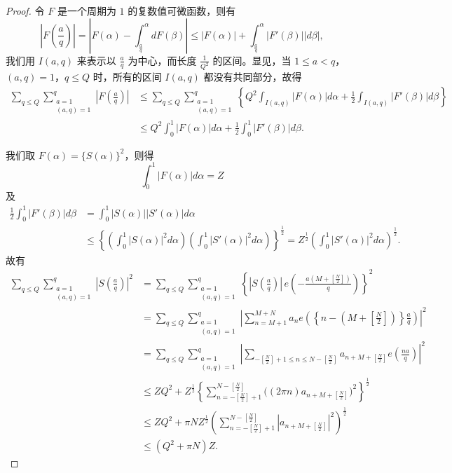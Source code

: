 \begin{proof}
令 $F$ 是一个周期为 $1$ 的复数值可微函数，则有
\[
\left|F\left(\frac{a}{q}\right)\right|
=\left|F(\alpha)-\int_{\frac{a}{q}}^{\alpha}dF(\beta)\right|
\leqslant|F(\alpha)|+\int_{\frac{a}{q}}^{\alpha}|F'(\beta)||d\beta|,
\]
我们用 $I(a,q)$ 来表示以 $\frac{a}{q}$ 为中心，而长度 $\frac{1}{Q^2}$ 的区间。显见，当 $1\leqslant a<q$，$(a,q)=1$，$q\leqslant Q$ 时，所有的区间 $I(a,q)$ 都没有共同部分，故得
\begin{align*}
\sum_{q\leqslant Q}\sum_{\substack{a=1\\(a,q)=1}}^{q}
\left|F\left(\frac{a}{q}\right)\right|
&\leqslant\sum_{q\leqslant Q}\sum_{\substack{a=1\\(a,q)=1}}^{q}
\left\{Q^2\int_{I(a,q)}|F(\alpha)|d\alpha
+\frac{1}{2}\int_{I(a,q)}|F'(\beta)|d\beta\right\}\\
&\leqslant Q^2\int_{0}^{1}|F(\alpha)|d\alpha
+\frac{1}{2}\int_{0}^{1}|F'(\beta)|d\beta.
\end{align*}

我们取 $F(\alpha)=\{S(\alpha)\}^2$，则得
\[
\int_{0}^{1}|F(\alpha)|d\alpha=Z
\]
及
\begin{align*}
\frac{1}{2}\int_{0}^{1}|F'(\beta)|d\beta
&=\int_{0}^{1}|S(\alpha)||S'(\alpha)|d\alpha\\
&\leqslant\left\{\left(\int_{0}^{1}|S(\alpha)|^2d\alpha\right)
\left(\int_{0}^{1}|S'(\alpha)|^2d\alpha\right)\right\}^{\frac12}
=Z^{\frac12}\left(\int_{0}^{1}|S'(\alpha)|^2d\alpha\right)^{\frac12}.
\end{align*}
故有
\begin{align*}
\sum_{q\leqslant Q}\sum_{\substack{a=1\\(a,q)=1}}^{q}
\left|S\left(\frac{a}{q}\right)\right|^2
&=\sum_{q\leqslant Q}\sum_{\substack{a=1\\(a,q)=1}}^{q}
\left\{\left|S\left(\frac{a}{q}\right)\right|
\,e\left(-\frac{a\left(M+\left[\frac{N}{2}\right]\right)}{q}\right)\right\}^2\\
&=\sum_{q\leqslant Q}\sum_{\substack{a=1\\(a,q)=1}}^{q}
\left|\sum_{n=M+1}^{M+N}a_n e\left(\left\{n-\left(M+\left[\frac{N}{2}\right]\right)\right\}\frac{a}{q}\right)\right|^2\\
&=\sum_{q\leqslant Q}\sum_{\substack{a=1\\(a,q)=1}}^{q}
\left|\sum_{-\left[\frac{N}{2}\right]+1\leqslant n\leqslant N-\left[\frac{N}{2}\right]}
a_{n+M+\left[\frac{N}{2}\right]}e\left(\frac{na}{q}\right)\right|^2\\
&\leqslant ZQ^2+Z^{\frac12}
\left\{\sum_{n=-\left[\frac{N}{2}\right]+1}^{N-\left[\frac{N}{2}\right]}
\bigl((2\pi n)a_{n+M+\left[\frac{N}{2}\right]}\bigr)^2\right\}^{\frac12}\\
&\leqslant ZQ^2+\pi NZ^{\frac12}
\left(\sum_{n=-\left[\frac{N}{2}\right]+1}^{N-\left[\frac{N}{2}\right]}
\left|a_{n+M+\left[\frac{N}{2}\right]}\right|^2\right)^{\frac12}\\
&\leqslant(Q^2+\pi N)Z.\tag{4}
\end{align*}


\end{proof}
